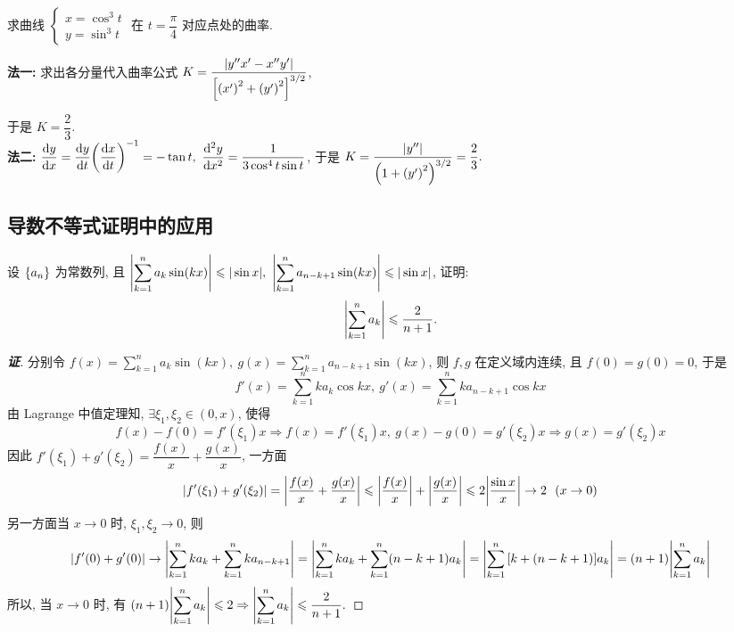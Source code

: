 \begin{example}[2018 数二]
    求曲线 $\begin{cases}
            x=\cos^3t \\y=\sin^3t
        \end{cases}$ 在 $t=\dfrac{\pi}{4}$ 对应点处的曲率.
\end{example}
\begin{solution}
    \textbf{法一: }求出各分量代入曲率公式 $K=\dfrac{|y''x'-x''y'|}{\qty[\qty(x')^2+\qty(y')^2]^{3/2}}$, 
    于是 $K=\dfrac{2}{3}.$\\
    \textbf{法二: }$\displaystyle \dv{y}{x}=\dv{y}{t}\qty(\dv{x}{t})^{-1}=-\tan t,~\dv[2]{y}{x}=\dfrac{1}{3\cos ^4t\sin t}$, 于是 $K=\dfrac{|y''|}{\qty(1+\qty(y')^2)^{3/2}}=\dfrac{2}{3}.$
\end{solution}

\subsection{导数不等式证明中的应用}

\begin{example}
    设 $\qty{a_n}$ 为常数列, 且 $\displaystyle\qty|\sum_{k=1}^{n}a_k\sin(kx)|\leqslant |\sin x|,~\qty|\sum_{k=1}^{n}a_{n-k+1}\sin(kx)|\leqslant |\sin x|$, 证明: $$\displaystyle \qty|\sum_{k=1}^{n}a_k|\leqslant \dfrac{2}{n+1}.$$
\end{example}
\begin{proof}[{\songti \textbf{证}}]
    分别令 $\displaystyle f(x)=\sum_{k=1}^{n}a_k\sin(kx),~g(x)=\sum_{k=1}^{n}a_{n-k+1}\sin(kx)$, 则 $f,g$ 在定义域内连续, 且 $f(0)=g(0)=0$, 于是
    $$f'(x)=\sum_{k=1}^{n}ka_k\cos kx,~g'(x)=\sum_{k=1}^{n}ka_{n-k+1}\cos kx$$
    由 Lagrange 中值定理知, $\exists\xi_1,\xi_2\in(0,x)$, 使得
    $$f(x)-f(0)=f'(\xi_1)x\Rightarrow f(x)=f'(\xi_1)x,~g(x)-g(0)=g'(\xi_2)x\Rightarrow g(x)=g'(\xi_2)x$$
    因此 $f'(\xi_1)+g'(\xi_2)=\dfrac{f(x)}{x}+\dfrac{g(x)}{x}$, 一方面
    $$\qty|f'(\xi_1)+g'(\xi_2)|=\qty|\dfrac{f(x)}{x}+\dfrac{g(x)}{x}|\leqslant \qty|\dfrac{f(x)}{x}|+\qty|\dfrac{g(x)}{x}|\leqslant 2\qty|\dfrac{\sin x}{x}|\to 2~~(x\to0)$$
    另一方面当 $x\to0$ 时, $\xi_1,\xi_2\to0$, 则
    $$\qty|f'(0)+g'(0)|\to\qty|\sum_{k=1}^{n}ka_k+\sum_{k=1}^{n}ka_{n-k+1}|=\qty|\sum_{k=1}^{n}ka_k+\sum_{k=1}^{n}(n-k+1)a_k|=\qty|\sum_{k=1}^{n}\qty[k+(n-k+1)]a_k|=(n+1)\qty|\sum_{k=1}^{n}a_k|$$
    所以, 当 $x\to0$ 时, 有 $\displaystyle (n+1)\qty|\sum_{k=1}^{n}a_k|\leqslant 2\Rightarrow \qty|\sum_{k=1}^{n}a_k|\leqslant \dfrac{2}{n+1}.$
\end{proof}
